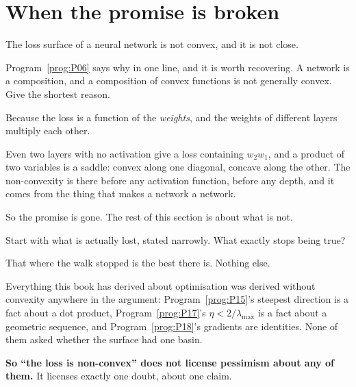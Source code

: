 \section{When the promise is broken}
\label{sec:P19-nonconvex}

\begin{fr}
The loss surface of a neural network is not convex, and it is not close.

Program~\ref{prog:P06} says why in one line, and it is worth recovering.
A network is a composition, and a composition of convex functions is not
generally convex. Give the shortest reason.
\nextframe
\end{fr}

\begin{fr}
\begin{ansblock}
Because the loss is a function of the \emph{weights}, and the weights of
different layers multiply each other.
\end{ansblock}

Even two layers with no activation give a loss containing $w_2 w_1$, and a
product of two variables is a saddle: convex along one diagonal, concave along
the other. The non-convexity is there before any activation function, before
any depth, and it comes from the thing that makes a network a network.

So the promise is gone. The rest of this section is about what is not.
\end{fr}

\begin{fr}
Start with what is actually lost, stated narrowly. What exactly stops being
true?
\dotline
\nextframe
\end{fr}

\begin{fr}
\begin{ansblock}
That where the walk stopped is the best there is. Nothing else.
\end{ansblock}

Everything this book has derived about optimisation was derived without
convexity anywhere in the argument: Program~\ref{prog:P15}'s steepest
direction is a fact about a dot product, Program~\ref{prog:P17}'s
$\eta < 2/\lambda_{\max}$ is a fact about a geometric sequence, and
Program~\ref{prog:P18}'s gradients are identities. None of them asked whether
the surface had one basin.

\textbf{So \enquote{the loss is non-convex} does not license pessimism about
any of them.} It licenses exactly one doubt, about one claim.
\end{fr}

